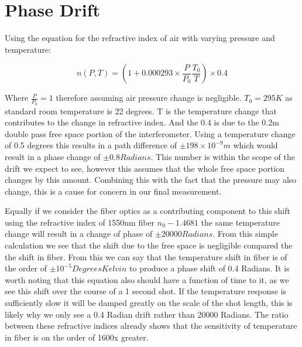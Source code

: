 \documentclass[12pt,a4paper,oneside]{report}
\begin{document}
\section{Phase Drift}
Using the equation for the refractive index of air with varying pressure and temperature:

\begin{equation}
n(P, T) = (1 + 0.000293 \times \frac{P}{P_{0}} \frac{T_{0}}{T})\times 0.4
\label{eq:refractive-temp}
\end{equation}

Where $\frac{P}{P_0} = 1$ therefore assuming air pressure change is negligible. $T_0 = 295K$ as standard room temperature is 22 degrees. T is the temperature change that contributes to the change in refractive index. And the 0.4 is due to the 0.2m double pass free space portion of the interferometer. Using a temperature change of 0.5 degrees \cite{Melikov1997AirRooms} this results in a path difference of $\pm 198\times 10^{-9}m$ which would result in a phase change of $\pm 0.8 Radians$. This number is within the scope of the drift we expect to see, however this assumes that the whole free space portion changes by this amount. Combining this with the fact that the pressure may also change, this is a cause for concern in our final measurement.

Equally if we consider the fiber optics as a contributing component to this shift using the refractive index of 1550nm fiber $n_{0} - 1.4681$ the same temperature change will result in a change of phase of $\pm 20000 Radians$. From this simple calculation we see that the shift due to the free space is negligible compared the the shift in fiber. From this we can say that the temperature shift in fiber is of the order of $\pm 10^{-5} Degrees Kelvin$ to produce a phase shift of 0.4 Radians. It is worth noting that this equation also should have a function of time to it, as we see this shift over the course of a 1 second shot. If the temperature response is sufficiently slow it will be damped greatly on the scale of the shot length, this is likely why we only see a 0.4 Radian drift rather than 20000 Radians. The ratio between these refractive indices already shows that the sensitivity of temperature in fiber is on the order of 1600x greater.
\end{document}
